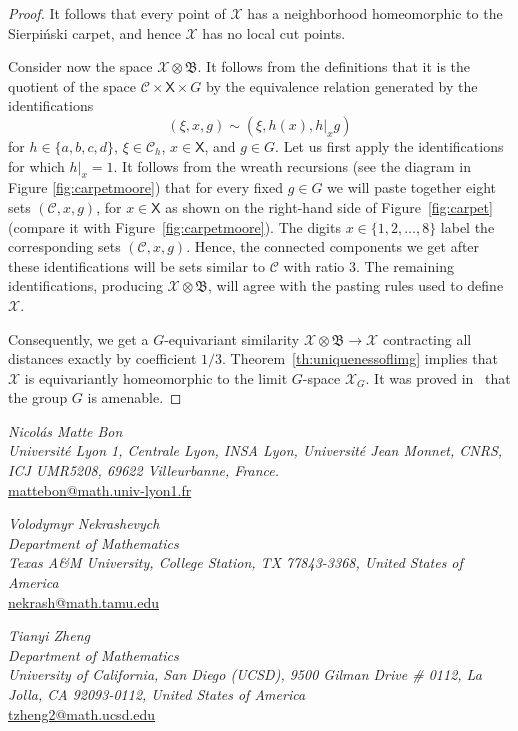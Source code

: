 \documentclass[11pt]{amsart}
\newcommand{\bim}{\mathfrak{B}}
\newcommand{\arr}{\longrightarrow}
\newcommand{\limg}[1][G]{\mathcal{X}_{#1}}
\newcommand{\alb}{\ensuremath{\mathsf{X}}}%
\theoremstyle{definition}
\theoremstyle{plain}
\newtheorem{main thm}{Theorem}
\theoremstyle{remark}
\theoremstyle{plain}
\begin{document}
\begin{proof}
It follows that every point of $\mathcal{X}$ has a neighborhood homeomorphic to the Sierpi\'nski carpet, and hence $\mathcal{X}$ has no local cut points.

Consider now the space $\mathcal{X}\otimes\bim$. It follows from the definitions that it is the quotient of the space $\mathcal{C}\times\alb\times G$ by the equivalence relation generated by the identifications
\[(\xi, x, g)\sim (\xi, h(x), h|_xg)\]
for $h\in\{a, b, c, d\}$, $\xi\in\mathcal{C}_h$, $x\in\alb$, and $g\in G$.
Let us first apply the identifications for which $h|_x=1$. It follows from the wreath recursions (see the diagram in Figure \ref{fig:carpetmoore}) that for every fixed $g\in G$ we will paste together eight sets $(\mathcal{C}, x, g)$, for $x\in\alb$ as shown on the right-hand side of Figure~\ref{fig:carpet} (compare it with Figure~\ref{fig:carpetmoore}). The digits $x\in\{1, 2, \ldots, 8\}$ label the corresponding sets $(\mathcal{C}, x, g)$. Hence, the connected components we get after these identifications will be sets similar to $\mathcal{C}$ with ratio 3. The remaining identifications, producing $\mathcal{X}\otimes\bim$, will agree with the pasting rules used to define $\mathcal{X}$.

Consequently, we get a $G$-equivariant similarity $\mathcal{X}\otimes\bim\arr\mathcal{X}$ contracting all distances exactly by coefficient $1/3$. Theorem~\ref{th:uniquenessoflimg} implies that $\mathcal{X}$ is equivariantly homeomorphic to the limit $G$-space $\limg$. It was proved in~\cite[\S6.3]{MNZ} that the group $G$ is amenable.
\end{proof}



	
	
	
	
	
\bigskip

{\small


\noindent\textit{Nicol\'as Matte Bon\\
Université Lyon 1, Centrale Lyon, INSA Lyon, Université Jean Monnet, CNRS, ICJ UMR5208, 69622 Villeurbanne, France.\\}
\href{mailto:mattebon@math.univ-lyon1.fr}{mattebon@math.univ-lyon1.fr}

\smallskip


\noindent\textit{Volodymyr Nekrashevych\\
	Department of Mathematics\\
 Texas A\&M University, College Station, TX 77843-3368, United States of America\\}
\href{mailto:nekrash@math.tamu.edu}{nekrash@math.tamu.edu}

\smallskip

\noindent\textit{Tianyi Zheng\\
	Department of Mathematics\\
 University of California, San Diego (UCSD),
9500 Gilman Drive \# 0112,
La Jolla, CA  92093-0112, United States of America\\}
\href{mailto:tzheng2@math.ucsd.edu}{tzheng2@math.ucsd.edu}

}
\end{document}
